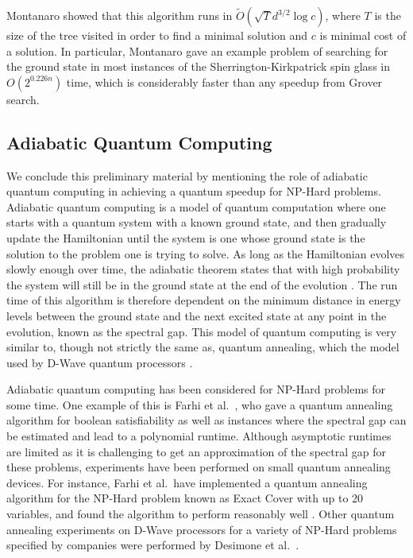 Montanaro showed that this algorithm runs in $\tilde{O}(\sqrt{T}d^{3/2}\log c)$, where $T$ is the size of the tree visited in order to find a minimal solution and $c$ is minimal cost of a solution. In particular, Montanaro gave an example problem of searching for the ground state in most instances of the Sherrington-Kirkpatrick spin glass in $O(2^{0.226n})$ time, which is considerably faster than any speedup from Grover search.

\subsection{Adiabatic Quantum Computing}

We conclude this preliminary material by mentioning the role of adiabatic quantum computing in achieving a quantum speedup for NP-Hard problems. Adiabatic quantum computing is a model of quantum computation where one starts with a quantum system with a known ground state, and then gradually update the Hamiltonian until the system is one whose ground state is the solution to the problem one is trying to solve. As long as the Hamiltonian evolves slowly enough over time, the adiabatic theorem states that with high probability the system will still be in the ground state at the end of the evolution \cite{das2008}. The run time of this algorithm is therefore dependent on the minimum distance in energy levels between the ground state and the next excited state at any point in the evolution, known as the spectral gap. This model of quantum computing is very similar to, though not strictly the same as, quantum annealing, which the model used by D-Wave quantum processors \cite{mcgeoch2019}.

Adiabatic quantum computing has been considered for NP-Hard problems for some time. One example of this is Farhi et al.\ \cite{farhi2000}, who gave a quantum annealing algorithm for boolean satisfiability as well as instances where the spectral gap can be estimated and lead to a polynomial runtime. Although asymptotic runtimes are limited as it is challenging to get an approximation of the spectral gap for these problems, experiments have been performed on small quantum annealing devices. For instance, Farhi et al.\ have implemented a quantum annealing algorithm for the NP-Hard problem known as Exact Cover with up to 20 variables, and found the algorithm to perform reasonably well \cite{farhi2001}. Other quantum annealing experiments on D-Wave processors for a variety of NP-Hard problems specified by companies were performed by Desimone et al.\ \cite{desimone2018}.

